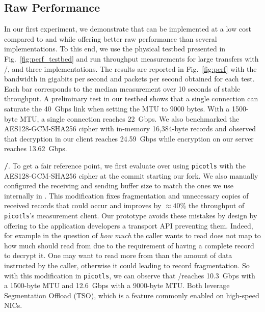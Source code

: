 


\subsection{Raw Performance} \label{sec:perf}
In our first experiment, we demonstrate that \tcpls can be implemented at a low
cost compared to \tcp and \tls while offering better raw performance than
several \quic implementations. To this end, we use the physical testbed
presented in Fig.~\ref{fig:perf_testbed} and run throughput measurements for
large transfers with \tcp/\tls, \tcpls and three \quic implementations.
The results are reported in Fig.~\ref{fig:perf} with the bandwidth
in gigabits per second and packets per second obtained for each test.
Each bar corresponds to the median measurement over 10 seconds of stable
throughput. A preliminary test in our testbed shows that a single \tcp
connection can saturate the 40~Gbps link when setting the MTU to 9000 bytes.
With a 1500-byte MTU, a single \tcp connection reaches 22~Gbps. We also
benchmarked the AES128-GCM-SHA256 cipher with in-memory 16,384-byte \tls
records and observed that decryption in our client reaches 24.59~Gbps while
encryption on our server reaches 13.62~Gbps.


\textbf{\tcp/\tls}. To get a fair reference point, we first evaluate \tls over
\tcp using \texttt{picotls} with the AES128-GCM-SHA256 cipher at the commit
starting our fork. We also manually configured the receiving and sending buffer
size to match the ones we use internally in \tcpls. This modification fixes
fragmentation and unnecessary copies of received \tls records that could occur
and improves by $\approx 40\%$ the throughput of \texttt{picotls}'s measurement
client. Our \tcpls prototype avoids these mistakes by design by offering to the
application developers a transport API preventing them. Indeed, for example in
\tcpls the question of \textit{how much} the caller wants to read does not map
to how much \tcpls should read from \tcp due to the requirement of having a
complete record to decrypt it. One may want to read more
from \tcp than the amount of data instructed by the caller, otherwise it could
leading to record fragmentation. %
So with this modification in \texttt{picotls}, we can observe that \tcp/\tls reaches
10.3~Gbps with a 1500-byte MTU and 12.6~Gbps with a 9000-byte MTU. Both
leverage \tcp Segmentation Offload (TSO), which is a
feature commonly enabled on high-speed NICs.

